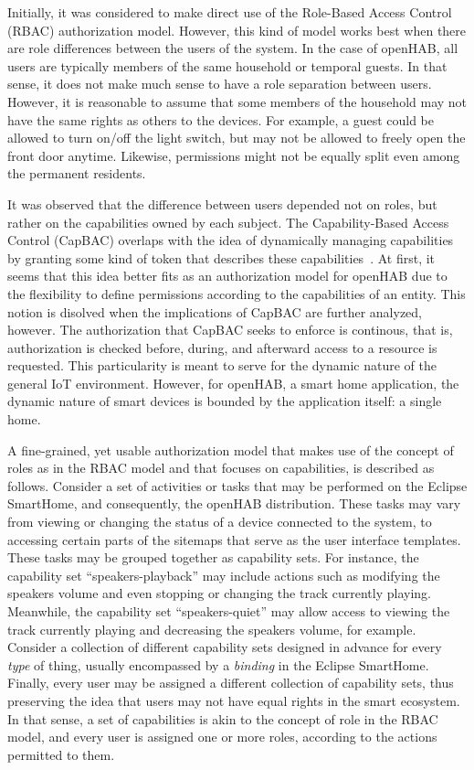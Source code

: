 \documentclass[12pt]{article}
\begin{document}
Initially, it was considered to make direct use of the Role-Based Access Control (RBAC) authorization model. However, this kind of model works best when there are role differences between the users of the system. In the case of openHAB, all users are typically members of the same household or temporal guests. In that sense, it does not make much sense to have a role separation between users. However, it is reasonable to assume that some members of the household may not have the same rights as others to the devices. For example, a guest could be allowed to turn on/off the light switch, but may not be allowed to freely open the front door anytime. Likewise, permissions might not be equally split even among the permanent residents.

It was observed that the difference between users depended not on roles, but rather on the capabilities owned by each subject. The Capability-Based Access Control (CapBAC) overlaps with the idea of dynamically managing capabilities by granting some kind of token that describes these capabilities~\cite{access_01}. At first, it seems that this idea better fits as an authorization model for openHAB due to the flexibility to define permissions according to the capabilities of an entity. This notion is disolved when the implications of CapBAC are further analyzed, however. The authorization that CapBAC seeks to enforce is continous, that is, authorization is checked before, during, and afterward access to a resource is requested. This particularity is meant to serve for the dynamic nature of the general IoT environment. However, for openHAB, a smart home application, the dynamic nature of smart devices is bounded by the application itself: a single home.

A fine-grained, yet usable authorization model that makes use of the concept of roles as in the RBAC model and that focuses on capabilities, is described as follows. Consider a set of activities or tasks that may be performed on the Eclipse SmartHome, and consequently, the openHAB distribution. These tasks may vary from viewing or changing the status of a device connected to the system, to accessing certain parts of the sitemaps that serve as the user interface templates. These tasks may be grouped together as capability sets. For instance, the capability set ``speakers-playback'' may include actions such as modifying the speakers volume and even stopping or changing the track currently playing. Meanwhile, the capability set ``speakers-quiet'' may allow access to viewing the track currently playing and decreasing the speakers volume, for example. Consider a collection of different capability sets designed in advance for every \emph{type} of thing, usually encompassed by a \emph{binding} in the Eclipse SmartHome. Finally, every user may be assigned a different collection of capability sets, thus preserving the idea that users may not have equal rights in the smart ecosystem. In that sense, a set of capabilities is akin to the concept of role in the RBAC model, and every user is assigned one or more roles, according to the actions permitted to them.
\end{document}

